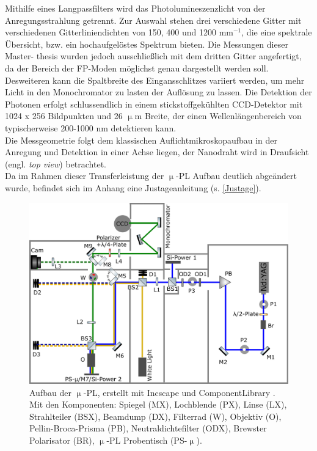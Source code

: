 Mithilfe eines Langpassfilters wird das Photolumineszenzlicht von der
Anregungsstrahlung getrennt.  Zur Auswahl stehen drei verschiedene Gitter mit
verschiedenen Gitterliniendichten von 150, 400 und 1200 mm$^{-1}$, die eine
spektrale Übersicht, bzw. ein hochaufgelöstes Spektrum bieten. Die Messungen
dieser Master- thesis wurden jedoch ausschließlich mit dem dritten Gitter
angefertigt, da der Bereich der FP-Moden möglichst genau dargestellt werden
soll. Desweiteren kann die Spaltbreite des Eingansschlitzes variiert werden, um
mehr Licht in den Monochromator zu lasten der Auflösung zu lassen. Die Detektion
der Photonen erfolgt schlussendlich in einem stickstoffgekühlten CCD-Detektor
mit 1024 x 256 Bildpunkten und 26 $\upmu$m Breite, der einen Wellenlängenbereich
von typischerweise 200-1000 nm detektieren kann.\\ Die Messgeometrie folgt dem
klassischen Auflichtmikroskopaufbau in der Anregung und Detektion in einer Achse
liegen, der Nanodraht wird in Draufsicht (engl. \textit{top view}) betrachtet.
\\ Da im Rahmen dieser Transferleistung der $\upmu$-PL Aufbau deutlich
abgeändert wurde, befindet sich im Anhang eine Justageanleitung (s.
\autoref{Justage}). \begin{figure}[h] \centering
\includegraphics[width=1\textwidth]{Bilder/methodik/opt_aufb} \caption[Aufbau
$\upmu$-PL]{Aufbau der $\upmu$-PL, erstellt mit Incscape und ComponentLibrary
\cite{lib}. Mit den Komponenten: Spiegel (MX), Lochblende (PX), Linse (LX),
Strahlteiler (BSX), Beamdump (DX), Filterrad (W), Objektiv (O),
Pellin-Broca-Prisma (PB), Neutraldichtefilter (ODX), Brewster Polarisator (BR),
$\upmu$-PL Probentisch (PS-$\upmu$).} \label{AufbauPL} \end{figure}
